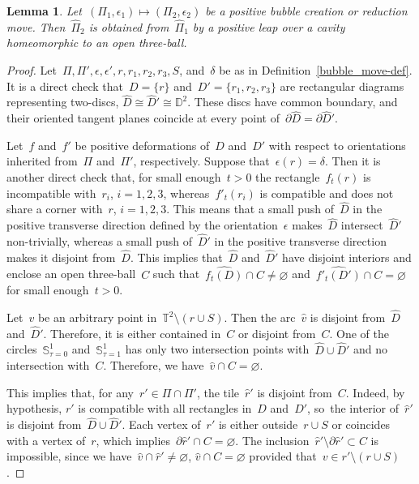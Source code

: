 \documentclass{amsart}
\theoremstyle{theorem}
\newtheorem{lemm}[theo]{Lemma}
\theoremstyle{remark}
\theoremstyle{definition}
\numberwithin{equation}{section}
\numberwithin{figure}{section}
\begin{document}
\begin{lemm}\label{bubble_cavity-lem}
Let~$(\Pi_1,\epsilon_1)\mapsto(\Pi_2,\epsilon_2)$ be a positive bubble creation or reduction move.
Then~$\widehat\Pi_2$ is obtained from~$\widehat\Pi_1$ by a positive leap over a cavity
homeomorphic to an open three-ball.
\end{lemm}

\begin{proof}
Let~$\Pi,\Pi',\epsilon,\epsilon',r,r_1,r_2,r_3,S$, and~$\delta$ be as in Definition~\ref{bubble_move-def}.
It is a direct check that~$D=\{r\}$ and~$D'=\{r_1,r_2,r_3\}$
are rectangular diagrams representing two-discs, $\widehat D\cong\widehat D'\cong\mathbb D^2$.
These discs have common boundary, and their oriented tangent planes coincide
at every point of~$\partial\widehat D=\partial\widehat D'$.

Let~$f$ and~$f'$ be positive deformations of~$D$ and~$D'$
with respect to orientations inherited from~$\Pi$ and~$\Pi'$, respectively.
Suppose that~$\epsilon(r)=\delta$. Then it is another direct check that, for small enough~$t>0$
the rectangle~$f_t(r)$ is incompatible with~$r_i$, $i=1,2,3$, whereas~$f'_t(r_i)$ is
compatible and does not share a corner with~$r$, $i=1,2,3$. This means that a small push of~$\widehat D$ in the positive
transverse direction defined by the orientation~$\epsilon$ makes~$\widehat D$ intersect~$\widehat D'$ non-trivially,
whereas a small push of~$\widehat D'$ in the positive transverse direction makes it disjoint from~$\widehat D$.
This implies that~$\widehat D$ and~$\widehat D'$ have disjoint interiors and enclose an open three-ball~$C$
such that~$\widehat{f_t(D)}\cap C\ne\varnothing$ and~$\widehat{f'_t(D')}\cap C=\varnothing$ for small enough~$t>0$.

Let~$v$ be an arbitrary point in~$\mathbb T^2\setminus(r\cup S)$. Then the arc~$\widehat v$ is disjoint from~$\widehat D$
and~$\widehat D'$. Therefore, it is either contained in~$C$ or disjoint from~$C$.
One of the circles~$\mathbb S^1_{\tau=0}$ and~$\mathbb S^1_{\tau=1}$ has only two
intersection points with~$\widehat D\cup\widehat D'$ and no intersection with~$C$. Therefore,
we have~$\widehat v\cap C=\varnothing$.

This implies that, for any~$r'\in\Pi\cap\Pi'$, the tile~$\widehat r'$ is disjoint from~$C$.
Indeed, by hypothesis, $r'$ is compatible with all rectangles in~$D$ and~$D'$,
so~the interior of~$\widehat r'$ is disjoint from~$\widehat D\cup\widehat D'$.
Each vertex of~$r'$ is either outside~$r\cup S$ or coincides with a vertex of~$r$,
which implies~$\partial\widehat r'\cap C=\varnothing$. The inclusion~$\widehat r'\setminus\partial\widehat r'\subset C$
is impossible, since we have~$\widehat v\cap\widehat r'\ne\varnothing$,
$\widehat v\cap C=\varnothing$ provided that~$v\in r'\setminus(r\cup S)$.


\end{proof}
\end{document}

